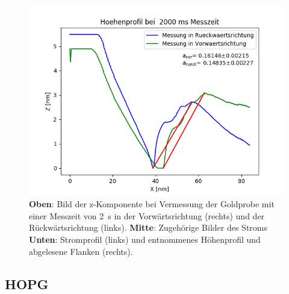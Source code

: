 \documentclass[12pt,a4paper]{article}
\begin{document}
\begin{figure}[H]
\includegraphics[scale=0.5]{Bilder/Anhang/Zeit/Profil_Zeit_2000.png}
\caption{\textbf{Oben}: Bild der z-Komponente bei Vermessung der Goldprobe mit einer Messzeit von \SI{2}{s} in der Vorwärtsrichtung (rechts) und der Rückwärtsrichtung (links). \textbf{Mitte}: Zugehörige Bilder des Stroms \textbf{Unten}: Stromprofil (links) und entnommenes Höhenprofil und abgelesene Flanken (rechts).}
\end{figure}

\subsection{HOPG}
\end{document}
